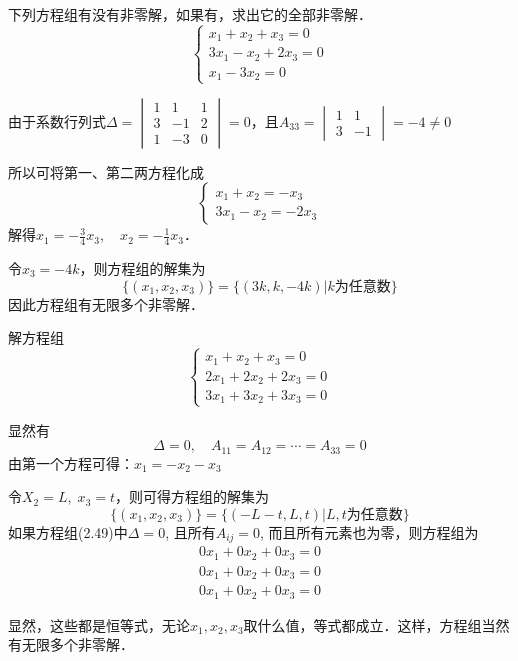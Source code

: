 \begin{example}
下列方程组有没有非零解，如果有，求出它的全部非零解．
\[\begin{cases}
    x_1+x_2+x_3=0\\ 3x_1-x_2+2x_3=0\\ x_1-3x_2=0
\end{cases}\]
\end{example}

\begin{solution}
    由于系数行列式$\Delta=\begin{vmatrix}
        1&1&1\\3&-1&2\\1&-3&0
    \end{vmatrix}=0$，且$A_{33}=\begin{vmatrix}
        1&1\\3&-1
    \end{vmatrix}=-4\ne 0$

所以可将第一、第二两方程化成
\[\begin{cases}
    x_1+x_2=-x_3\\
    3x_1-x_2=-2x_3
\end{cases}\]
解得$x_1=-\frac{3}{4}x_3,\quad x_2=-\frac{1}{4}x_3$．

令$x_3=-4k$，则方程组的解集为
\[\{(x_1,x_2,x_3)\}=\{(3k,k,-4k)|\text{$k$为任意数}\}\]
因此方程组有无限多个非零解．
\end{solution}

\begin{example}
解方程组\[\begin{cases}
    x_1+x_2+x_3=0\\
    2x_1+2x_2+2x_3=0\\
    3x_1+3x_2+3x_3=0
\end{cases}\]
\end{example}

\begin{solution}
显然有
\[\Delta=0,\quad A_{11}=A_{12}=\cdots=A_{33}=0\]
由第一个方程可得：$x_1=-x_2-x_3$

令$X_2=L,\; x_3=t$，则可得方程组的解集为
\[\{(x_1,x_2,x_3)\}=\{(-L-t,L,t)|\text{$L,t$为任意数}\}\]
如果方程组(2.49)中$\Delta=0$, 且所有$A_{ij}=0$, 而且所有元素也为零，则方程组为
\[\begin{split}
   0x_1+0x_2+0x_3=0\\
   0x_1+0x_2+0x_3=0\\
   0x_1+0x_2+0x_3=0 
\end{split}\]

显然，这些都是恒等式，无论$x_1,x_2,x_3$取什么值，等式都成立．这样，方程组当然有无限多个非零解．
\end{solution}

